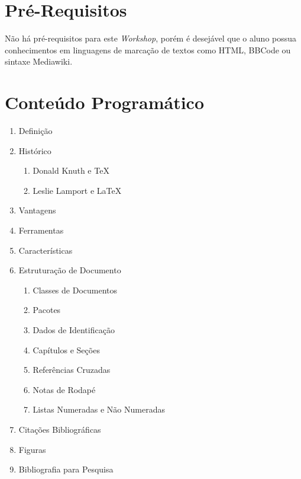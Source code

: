 \documentclass{article}
\begin{document}
\section{Pré-Requisitos}
\label{sec:pre-requisitos}

Não há pré-requisitos para este \emph{Workshop}, porém é desejável que o aluno
possua conhecimentos em linguagens de marcação de textos como HTML, BBCode ou
sintaxe Mediawiki.

\section{Conteúdo Programático}
\label{sec:conteudo-programatico}

\begin{enumerate}
    \item Definição
    \item Histórico
    \begin{enumerate}
        \item Donald Knuth e \TeX{}
        \item Leslie Lamport e \LaTeX{}
    \end{enumerate}
    \item Vantagens
    \item Ferramentas
    \item Características
    \item Estruturação de Documento
    \begin{enumerate}
        \item Classes de Documentos
        \item Pacotes
        \item Dados de Identificação
        \item Capítulos e Seções
        \item Referências Cruzadas
        \item Notas de Rodapé
        \item Listas Numeradas e Não Numeradas
    \end{enumerate}
    \item Citações Bibliográficas
    \item Figuras
    \item Bibliografia para Pesquisa
\end{enumerate}

\end{document}
